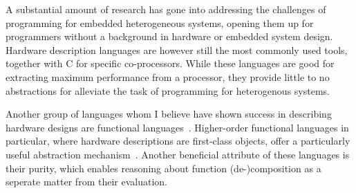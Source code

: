 \documentclass[../main.tex]{subfiles}
\begin{document}


A substantial amount of research has gone into addressing the challenges of programming for embedded heterogeneous systems, opening them up for programmers without a background in hardware or embedded system design. Hardware description languages are however still the most commonly used tools, together with C for specific co-processors. While these languages are good for extracting maximum performance from a processor, they provide little to no abstractions for alleviate the task of programming for heterogenous systems.




Another group of languages whom I believe have shown success in describing hardware designs are functional languages~\cite{sheeran2005}. Higher-order functional languages in particular, where hardware descriptions are first-class objects, offer a particularly useful abstraction mechanism~\cite{baaij2010, bjesse1998, gill2010}. Another beneficial attribute of these languages is their purity, which enables reasoning about function (de-)composition as a seperate matter from their evaluation.

\end{document}
